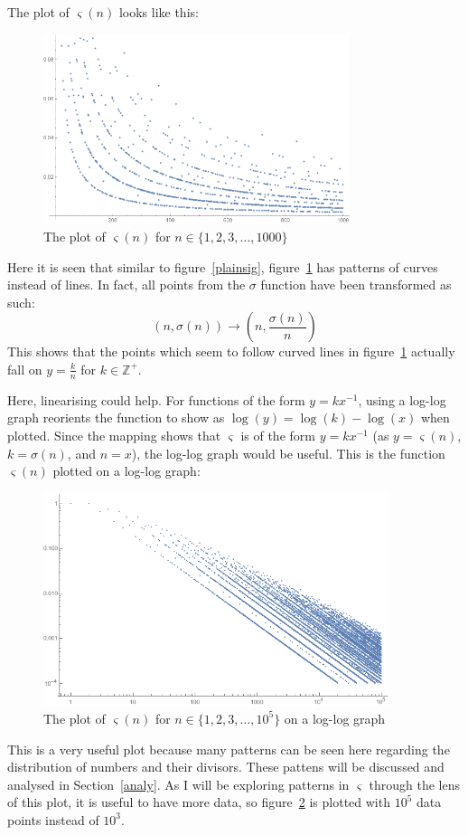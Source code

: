 \documentclass[12pt]{article}
\begin{document}
		The plot of $\varsigma(n)$ looks like this:
		\begin{figure}[H]
			\includegraphics[width=0.8\textwidth]{../Images/varsignonlog.png}
			\caption{The plot of $\varsigma(n)$ for $n\in\{1,2,3,\ldots,1000\}$\label{plainvar}}
		\end{figure}
		Here it is seen that similar to figure~\ref{plainsig}, figure~\ref{plainvar} has patterns of curves instead of lines. In fact, all points from the $\sigma$ function have been transformed as such:
		$$(n,\sigma(n))\to\left( n,\frac{\sigma(n)}{n} \right)$$
		This shows that the points which seem to follow curved lines in figure~\ref{plainvar} actually fall on $\displaystyle{y=\frac{k}{n}}$ for $k\in\mathbb{Z}^+$.

		Here, linearising could help. For functions of the form $y=kx^{-1}$, using a log-log graph reorients the function to show as $\log(y)=\log(k)-\log(x)$ when plotted. Since the mapping shows that $\varsigma$ is of the form $y=kx^{-1}$ (as $y=\varsigma(n)$, $k=\sigma(n)$, and $n=x$), the log-log graph would be useful. This is the function $\varsigma(n)$ plotted on a log-log graph:
		\begin{figure}[H]
			\includegraphics[width=0.9\textwidth]{../Images/plot.png}
			\caption{The plot of $\varsigma(n)$ for $n\in\{1,2,3,\ldots,10^5\}$ on a log-log graph\label{main}}
		\end{figure}
		This is a very useful plot because many patterns can be seen here regarding the distribution of numbers and their divisors. These pattens will be discussed and analysed in Section~\ref{analy}. As I will be exploring patterns in $\varsigma$ through the lens of this plot, it is useful to have more data, so figure~\ref{main} is plotted with $10^5$ data points instead of $10^3$.
\end{document}
